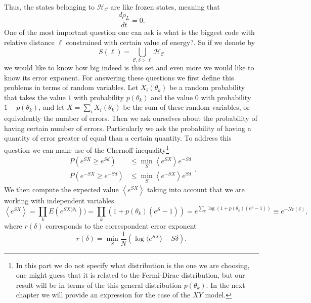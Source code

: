 Thus, the states belonging to $ \mathcal{H}_{\mathcal{C}}$ are like frozen states, meaning that
\begin{equation}
\frac{d\rho_L}{dt}=0.
\end{equation}
One of the most important question one can ask is what is the biggest code with relative distance $\ell$ constrained with certain value of energy?. So if we denote by
\begin{equation}
S(\ell) = \bigcup_{\mathcal{C}, \delta>\ell}\mathcal{H}_{\mathcal{C}} 
\end{equation} 
we would like to know how big indeed is this set and even more we would like to know its error exponent. For answering these questions we first define this problems in terms of random variables. Let $X_i(\theta_k)$ be a random probability that takes the value $1$ with probability $p(\theta_k)$ and the value $0$ with probability $1-p(\theta_k)$, and let $X=\sum_{i}X_i(\theta_k)$ be the sum of these random variables, or equivalently the number of errors. Then we ask ourselves about the probability of having certain number of errors. Particularly we ask the probability of having a quantity of error greater of equal than a certain quantity. To address this question we can make use of the Chernoff inequality\footnote{In this part we do not specify what distribution is the one we are choosing, one might guess that it is related to the Fermi-Dirac distribution, but our result will be in terms of the this general distribution $p(\theta_k)$. In the next chapter we will provide an expression for the case of the $XY$ model.} 
\begin{equation}
\begin{aligned}
P(e^{S X}\geq e^{S d})&\leq \min_{S}\left\langle e^{S X}\right\rangle e^{-S d}\\
P(e^{-S X}\geq e^{-S d})&\leq \min_{S}\left\langle e^{-S X}\right\rangle e^{S d}
\end{aligned}.
\end{equation}
We then compute the expected value $\left\langle e^{S X}\right\rangle$ taking into account that we are working with independent variables.
\begin{equation}
\left\langle e^{S X}\right\rangle = \prod_{k}  E(e^{S X(\theta_k})) = \prod_k \left(1+p(\theta_k)(e^S -1)\right) = e^{\sum_{k}\log(1+p(\theta_k)(e^S -1))}\equiv e^{-Nr(\delta)},
\end{equation}
where $r(\delta)$ corresponds to the correspondent error exponent
\begin{equation}
r(\delta) = \min_{S} \frac{1}{N} \left(\log\langle e^{SX}\rangle - S\delta\right).
\end{equation}

